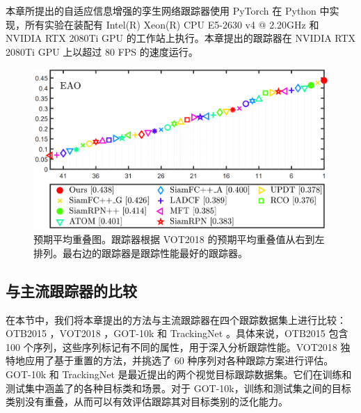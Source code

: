 本章所提出的自适应信息增强的孪生网络跟踪器使用 PyTorch 在 Python 中实现，所有实验在装配有 Intel(R) Xeon(R) CPU E5-2630 v4 @ 2.20GHz
和 NVIDIA RTX 2080Ti GPU 的工作站上执行。本章提出的跟踪器在 NVIDIA RTX 2080Ti GPU 上以超过 80 FPS 的速度运行。

\begin{figure}[t]
    \centering
    \includegraphics[width=1.0\textwidth]{Img/MTP/vot18/vot18_eao.png}
    \caption{预期平均重叠图。跟踪器根据 VOT2018 的预期平均重叠值从右到左排列。最右边的跟踪器是跟踪性能最好的跟踪器。}
    \label{fig:eao}
\end{figure}


\subsection{与主流跟踪器的比较}

在本节中，我们将本章提出的方法与主流跟踪器在四个跟踪数据集上进行比较：OTB2015 \cite{OTB}，VOT2018 \cite{kristan2018sixth}，GOT-10k \cite{GOT-10k} 和 TrackingNet \cite{muller2018trackingnet}。具体来说，OTB2015 \cite{OTB} 包含 100 个序列，这些序列标记有不同的属性，用于深入分析跟踪性能。VOT2018 \cite{kristan2018sixth} 独特地应用了基于重置的方法，并挑选了 60 种序列对各种跟踪方案进行评估。GOT-10k \cite{GOT-10k} 和 TrackingNet \cite{muller2018trackingnet} 是最近提出的两个视觉目标跟踪数据集。它们在训练和测试集中涵盖了的各种目标类和场景。对于 GOT-10k，训练和测试集之间的目标类别没有重叠，从而可以有效评估跟踪其对目标类别的泛化能力。

